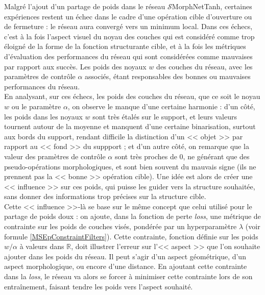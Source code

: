Malgré l'ajout d'un partage de poids dans le réseau $\mathcal{S}$MorphNetTanh, certaines expériences restent un échec dans le cadre d'une opération cible d'ouverture ou de fermeture : le réseau aura convergé vers un minimum local. Dans ces échecs, c'est à la fois l'aspect visuel du noyau des couches qui est considéré comme trop éloigné de la forme de la fonction structurante cible, et à la fois les métriques d'évaluation des performances du réseau qui sont considérées comme mauvaises par rapport aux succès. Les poids des noyaux $w$ des couches du réseau, avec les paramètres de contrôle $\alpha$ associés, étant responsables des bonnes ou mauvaises performances du réseau. \\

\vspace{-1.6mm}
En analysant, sur ces échecs, les poids des couches du réseau, que ce soit le noyau $w$ ou le paramètre $\alpha$, on observe le manque d'une certaine harmonie : d'un côté, les poids dans les noyaux $w$ sont très étalés sur le support, et leurs valeurs tournent autour de la moyenne et manquent d'une certaine binarisation, surtout aux bords du support, rendant difficile la distinction d'un << objet >> par rapport au << fond >> du suppport ; et d'un autre côté, on remarque que la valeur des pramètres de contrôle $\alpha$ sont très proches de $0$, ne générant que des pseudo-opérations morphologiques, et sont bien souvent du mauvais signe (ils ne prennent pas la << bonne >> opération cible). Une idée est alors de créer une << influence >> sur ces poids, qui puisse les guider vers la structure souhaitée, sans donner des informations trop précises sur la structure cible. \\

\vspace{-1.6mm}
Cette << influence >>-là se base sur le même concept que celui utilisé pour le partage de poids doux : on ajoute, dans la fonction de perte \textit{loss}, une métrique de contrainte sur les poids de couches visés, pondérée par un hyperparamètre $\lambda$ (voir formule \ref{MSEpConstraintFilters}). Cette contrainte, fonction définie sur les poids $w / \alpha$ à valeurs dans $\mathbb{R}$, doit illustrer l'erreur sur l'<< aspect >> que l'on souhaite ajouter dans les poids du réseau. Il peut s'agir d'un aspect géométrique, d'un aspect morphologique, ou encore d'une distance. En ajoutant cette contrainte dans la \textit{loss}, le réseau va alors se forcer à minimiser cette contrainte lors de son entraînement, faisant tendre les poids vers l'aspect souhaité.  \\


